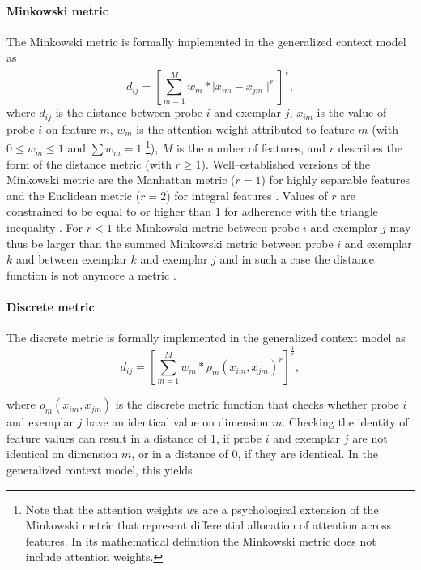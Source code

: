 \documentclass[a4paper,man,natbib]{apa6}
\begin{document}
\paragraph{Minkowski metric}
The Minkowski metric is formally implemented in the generalized context model as
\begin{equation}
d_{ij} = \left[\sum\limits_{m=1}^M w_{m}*\mid x_{im} - x_{jm}\mid ^r\right]^\frac{1}{r},
\end{equation}
where $d_{ij}$ is the distance between probe $i$ and exemplar $j$, $x_{im}$ is the value of probe $i$ on feature $m$, $w_{m}$ is the attention weight attributed to feature $m$ (with $0 \leq w_{m} \leq 1$ and $\sum w_{m} = 1$ \footnote{Note that the attention weights $w$s are a psychological extension of the Minkowski metric that represent differential allocation of attention across features. In its mathematical definition the Minkowski metric does not include attention weights.}), $M$ is the number of features, and $r$ describes the form of the distance metric (with $r \geq 1$). Well--established versions of the Minkowski metric are the Manhattan metric ($r = 1$) for highly separable features and the Euclidean metric ($r = 2$) for integral features \citep{shepard1964attention, nosofsky1986attention, garner1974processing}. Values of $r$ are constrained to be equal to or higher than 1 for adherence with the triangle inequality \citep{jakel2008similarity,francois2007concentration,tversky1982similarity,beals1968foundations}. For $r < 1$ the Minkowski metric between probe $i$ and exemplar $j$ may thus be larger than the summed Minkowski metric between probe $i$ and exemplar $k$ and between exemplar $k$ and exemplar $j$ and in such a case the distance function is not anymore a metric \citep[][p. 5]{kress1989linear}. 

\paragraph{Discrete metric}
The discrete metric is formally implemented in the generalized context model as 
\begin{equation}
d_{ij} = \left[\sum\limits_{m=1}^M w_{m}* \rho_{m}(x_{im}, x_{jm}) ^r\right]^\frac{1}{r},
\label{eq:distance}
\end{equation}

where $\rho_{m}(x_{im}, x_{jm})$ is the discrete metric function that checks whether probe $i$ and exemplar $j$ have an identical value on dimension $m$. Checking the identity of feature values can result in a distance of 1, if probe $i$ and exemplar $j$ are not identical on dimension $m$, or in a distance of 0, if they are identical. In the generalized context model, this yields
\end{document}
